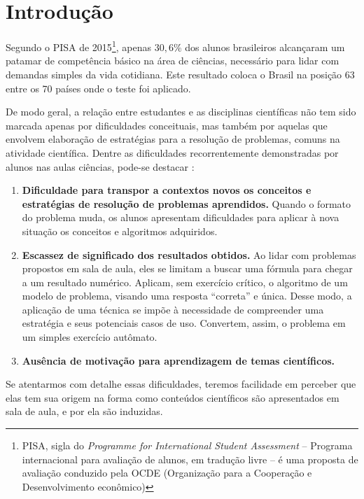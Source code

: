 \chapter*[Introdução]{Introdução}

Segundo o PISA de 2015\footnote{PISA, sigla do \textit{Programme for International Student Assessment} -- Programa internacional para avaliação de alunos, em tradução livre -- é uma proposta de avaliação conduzido pela OCDE (Organização para a Cooperação e Desenvolvimento econômico)}, apenas $30,6\%$ dos alunos brasileiros alcançaram um patamar de competência básico na área de ciências, necessário para lidar com demandas simples da vida cotidiana. Este resultado coloca o Brasil na posição 63 entre os 70 países onde o teste foi aplicado.

De modo geral, a relação entre estudantes e as disciplinas científicas não tem sido marcada apenas por dificuldades conceituais, mas também por aquelas que envolvem elaboração de estratégias para a resolução de problemas, comuns na atividade científica. Dentre as dificuldades recorrentemente demonstradas por alunos nas aulas ciências, pode-se destacar \cite{Pozo}:


\begin{enumerate}
  \item \textbf{Dificuldade para transpor a contextos novos os conceitos e estratégias de resolução de problemas aprendidos.} Quando o formato do problema muda, os alunos apresentam dificuldades para aplicar à nova situação os conceitos e algoritmos adquiridos. 

  \item \textbf{Escassez de significado dos resultados obtidos.} Ao lidar com problemas propostos em sala de aula, eles se limitam a buscar uma fórmula para chegar a um resultado numérico. Aplicam, sem exercício crítico, o algoritmo de um modelo de problema, visando uma resposta ``correta'' e única. Desse modo, a aplicação de uma técnica se impõe à necessidade de compreender uma estratégia e seus potenciais casos de uso. Convertem, assim, o problema em um simples exercício autômato. 

  
  \item \textbf{Ausência de motivação para aprendizagem de temas científicos.}
\end{enumerate}

Se atentarmos com detalhe essas dificuldades, teremos facilidade em perceber que elas tem sua origem na forma como conteúdos científicos são apresentados em sala de aula, e por ela são induzidas.

